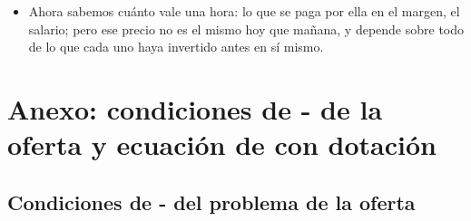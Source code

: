 \documentclass[11pt]{article}
\begin{document}
\begin{itemize}
\begin{itemize}
  \item Ahora sabemos cuánto vale una hora: lo que se paga por ella en el margen, el salario; pero ese precio no es el mismo hoy que mañana, y depende sobre todo de lo que cada uno haya invertido antes en sí mismo.
  \end{itemize}
\end{itemize}

\clearpage
\appendix
\section{Anexo: condiciones de - de la oferta\cortetitulo{} y ecuación de  con dotación}\label{anexo:slutsky-dotacion}

\subsection{Condiciones de - del problema de la oferta}\label{anexo:kt-oferta}
\end{document}
